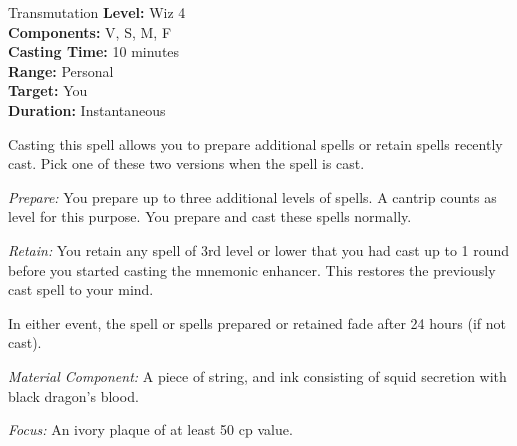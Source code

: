 {Transmutation}
{
	\textbf{Level:}
	Wiz 4\\
	\textbf{Components:}
	V, S, M, F\\
	\textbf{Casting Time:}
	10 minutes\\
	\textbf{Range:}
	Personal\\
	\textbf{Target:}
	You\\
	\textbf{Duration:}
	Instantaneous\\
}
{
	Casting this spell allows you to prepare additional spells or retain spells recently cast. Pick one of these two versions when the spell is cast.

	\textit{Prepare:}
	You prepare up to three additional levels of spells. A cantrip counts as \onehalf level for this purpose. You prepare and cast these spells normally.

	\textit{Retain:}
	You retain any spell of 3rd level or lower that you had cast up to 1 round before you started casting the mnemonic enhancer. This restores the previously cast spell to your mind.

	In either event, the spell or spells prepared or retained fade after 24 hours (if not cast).

	\textit{Material Component:}
	A piece of string, and ink consisting of squid secretion with black dragon's blood.

	\textit{Focus:}
	An ivory plaque of at least 50 cp value.

}
